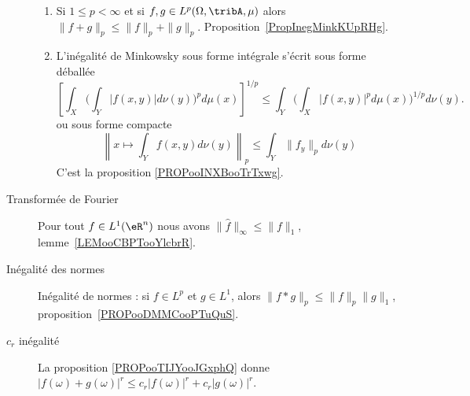 \begin{description}
\begin{enumerate}
			\item
			      Si \( 1\leq p<\infty\) et si \( f,g\in L^p(\Omega,\tribA,\mu)\) alors \(  \| f+g \|_p\leq \| f \|_p+\| g \|_p\). Proposition~\ref{PropInegMinkKUpRHg}.
			\item
			      L'inégalité de Minkowsky sous forme intégrale s'écrit sous forme déballée
			      \begin{equation*}
				      \left[ \int_X\Big( \int_Y| f(x,y) |d\nu(y) \Big)^pd\mu(x) \right]^{1/p}\leq \int_Y\Big( \int_X| f(x,y) |^pd\mu(x) \Big)^{1/p}d\nu(y).
			      \end{equation*}
			      ou sous forme compacte
			      \begin{equation*}
				      \left\|   x\mapsto\int_Y f(x,y)d\nu(y)   \right\|_p\leq \int_Y  \| f_y \|_pd\nu(y)
			      \end{equation*}
			      C'est la proposition \ref{PROPooINXBooTrTxwg}.
		\end{enumerate}
	\item[Transformée de Fourier]
		Pour tout \( f\in L^1(\eR^n)\) nous avons \( \| \hat f \|_{\infty}\leq \| f \|_1\), lemme~\ref{LEMooCBPTooYlcbrR}.
	\item[Inégalité des normes]
		Inégalité de normes : si \( f\in L^p\) et \( g\in L^1\), alors \( \| f*g \|_p\leq \| f \|_p\| g \|_1\), proposition~\ref{PROPooDMMCooPTuQuS}.
	\item[\( c_r\) inégalité] La proposition \ref{PROPooTIJYooJGxphQ} donne \( \big|  f(\omega)+g(\omega)  \big|^r\leq  c_r| f(\omega) |^r+c_r| g(\omega) |^r \).
\end{description}
